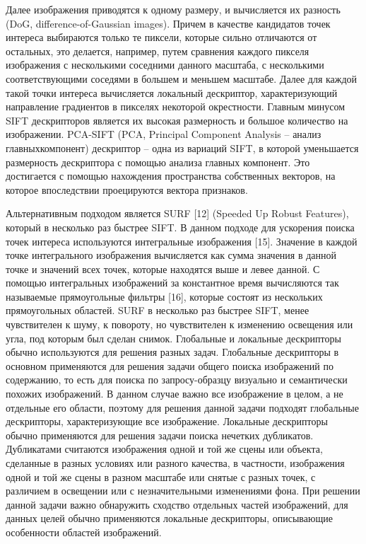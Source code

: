 Далее изображения приводятся к одному размеру, и вычисляется их
разность (DoG, difference-of-Gaussian images). Причем в
качестве кандидатов точек интереса выбираются только те пиксели, которые сильно
отличаются от остальных, это делается, например, путем сравнения каждого пикселя
изображения с несколькими соседними данного масштаба, с несколькими
соответствующими соседями в большем и меньшем масштабе. 
Далее для каждой такой точки интереса вычисляется локальный дескриптор,
характеризующий направление градиентов в пикселях некоторой окрестности. Главным
минусом SIFT дескрипторов является их высокая размерность и большое количество на
изображении. PCA-SIFT \cite{ke2004pcasift} (PCA, Principal Component Analysis – анализ главныхкомпонент) дескриптор – одна из вариаций SIFT, в которой уменьшается размерность
дескриптора с помощью анализа главных компонент. Это достигается с помощью
нахождения пространства собственных векторов, на которое впоследствии проецируются
вектора признаков.


Альтернативным подходом является SURF [12] (Speeded Up Robust Features),
который в несколько раз быстрее SIFT. В данном подходе для ускорения поиска точек
интереса используются интегральные изображения [15]. Значение в каждой точке
интегрального изображения вычисляется как сумма значения в данной точке и значений
всех точек, которые находятся выше и левее данной. С помощью интегральных
изображений за константное время вычисляются так называемые прямоугольные фильтры
[16], которые состоят из нескольких прямоугольных областей. SURF в несколько раз
быстрее SIFT, менее чувствителен к шуму, к повороту, но чувствителен к изменению
освещения или угла, под которым был сделан снимок.
Глобальные и локальные дескрипторы обычно используются для решения разных
задач. Глобальные дескрипторы в основном применяются для решения задачи общего
поиска изображений по содержанию, то есть для поиска по запросу-образцу визуально и
семантически похожих изображений. В данном случае важно все изображение в целом, а
не отдельные его области, поэтому для решения данной задачи подходят глобальные
дескрипторы, характеризующие все изображение. Локальные дескрипторы обычно
применяются для решения задачи поиска нечетких дубликатов. Дубликатами считаются 
изображения одной и той же сцены или объекта, сделанные в разных условиях или
разного качества, в частности, изображения одной и той же сцены в разном масштабе или
снятые с разных точек, с различием в освещении или с незначительными изменениями
фона. При решении данной задачи важно обнаружить сходство отдельных частей
изображений, для данных целей обычно применяются локальные дескрипторы,
описывающие особенности областей изображений.



